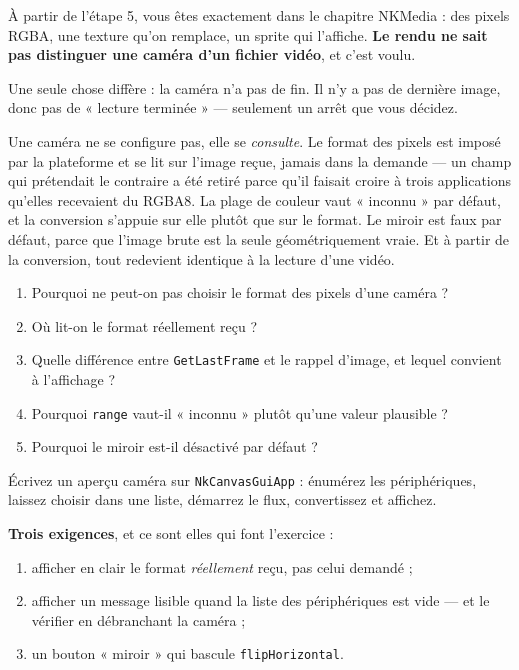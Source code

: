 \begin{nkretenir}
À partir de l'étape 5, vous êtes exactement dans le chapitre NKMedia : des pixels
RGBA, une texture qu'on remplace, un sprite qui l'affiche. \textbf{Le rendu ne
sait pas distinguer une caméra d'un fichier vidéo}, et c'est voulu.

Une seule chose diffère : la caméra n'a pas de fin. Il n'y a pas de dernière
image, donc pas de « lecture terminée » --- seulement un arrêt que vous décidez.
\end{nkretenir}

\begin{nkbilan}
Une caméra ne se configure pas, elle se \emph{consulte}. Le format des pixels est
imposé par la plateforme et se lit sur l'image reçue, jamais dans la demande ---
un champ qui prétendait le contraire a été retiré parce qu'il faisait croire à
trois applications qu'elles recevaient du RGBA8. La plage de couleur vaut
« inconnu » par défaut, et la conversion s'appuie sur elle plutôt que sur le
format. Le miroir est faux par défaut, parce que l'image brute est la seule
géométriquement vraie. Et à partir de la conversion, tout redevient identique à
la lecture d'une vidéo.
\end{nkbilan}

\begin{nkquestions}
\begin{enumerate}
\item Pourquoi ne peut-on pas choisir le format des pixels d'une caméra ?
\item Où lit-on le format réellement reçu ?
\item Quelle différence entre \texttt{GetLastFrame} et le rappel d'image, et
      lequel convient à l'affichage ?
\item Pourquoi \texttt{range} vaut-il « inconnu » plutôt qu'une valeur plausible ?
\item Pourquoi le miroir est-il désactivé par défaut ?
\end{enumerate}
\end{nkquestions}

\begin{nkpratique}
Écrivez un aperçu caméra sur \texttt{NkCanvasGuiApp} : énumérez les
périphériques, laissez choisir dans une liste, démarrez le flux, convertissez et
affichez.

\textbf{Trois exigences}, et ce sont elles qui font l'exercice :
\begin{enumerate}
\item afficher en clair le format \emph{réellement} reçu, pas celui demandé ;
\item afficher un message lisible quand la liste des périphériques est vide ---
      et le vérifier en débranchant la caméra ;
\item un bouton « miroir » qui bascule \texttt{flipHorizontal}.
\end{enumerate}
\end{nkpratique}

